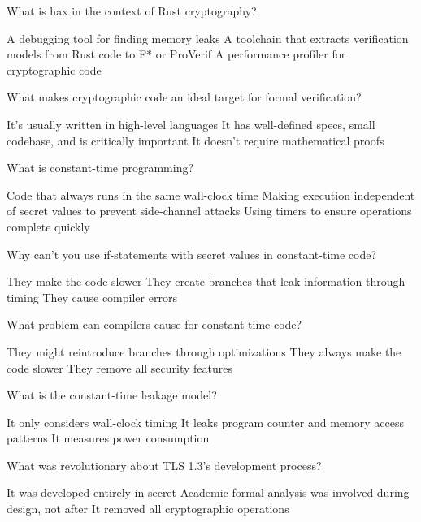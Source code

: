 \documentclass[10pt,a4paper,american]{exam}
\begin{document}
\begin{questions}
	\question What is hax in the context of Rust cryptography?
	\begin{randomizechoices}
		\choice A debugging tool for finding memory leaks
		\CorrectChoice A toolchain that extracts verification models from Rust code to F* or ProVerif
		\choice A performance profiler for cryptographic code
	\end{randomizechoices}

	\question What makes cryptographic code an ideal target for formal verification?
	\begin{randomizechoices}
		\choice It's usually written in high-level languages
		\CorrectChoice It has well-defined specs, small codebase, and is critically important
		\choice It doesn't require mathematical proofs
	\end{randomizechoices}

	\question What is constant-time programming?
	\begin{randomizechoices}
		\choice Code that always runs in the same wall-clock time
		\CorrectChoice Making execution independent of secret values to prevent side-channel attacks
		\choice Using timers to ensure operations complete quickly
	\end{randomizechoices}

	\question Why can't you use if-statements with secret values in constant-time code?
	\begin{randomizechoices}
		\choice They make the code slower
		\CorrectChoice They create branches that leak information through timing
		\choice They cause compiler errors
	\end{randomizechoices}

	\question What problem can compilers cause for constant-time code?
	\begin{randomizechoices}
		\CorrectChoice They might reintroduce branches through optimizations
		\choice They always make the code slower
		\choice They remove all security features
	\end{randomizechoices}

	\question What is the constant-time leakage model?
	\begin{randomizechoices}
		\choice It only considers wall-clock timing
		\CorrectChoice It leaks program counter and memory access patterns
		\choice It measures power consumption
	\end{randomizechoices}

	\question What was revolutionary about TLS 1.3's development process?
	\begin{randomizechoices}
		\choice It was developed entirely in secret
		\CorrectChoice Academic formal analysis was involved during design, not after
		\choice It removed all cryptographic operations
	\end{randomizechoices}


\end{questions}
\end{document}
